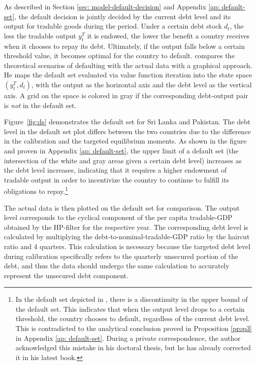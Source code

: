 As described in Section \ref{sec: model-default-decision} and Appendix \ref{ap: default-set}, the default decision is jointly decided by the current debt level and its output for tradable goods during the period. Under a certain debt stock $d_t$, the less the tradable output $y^T_t$ it is endowed, the lower the benefit a country receives when it chooses to repay its debt.
Ultimately, if the output falls below a certain threshold value, it becomes optimal for the country to default.
\citet{Hinrichsen_2020-chapter4} compares the theoretical scenarios of defaulting with the actual data with a graphical approach. He maps the default set evaluated via value function iteration into the state space $(y^T_t, d_t)$, with the output as the horizontal axis and the debt level as the vertical axis. A grid on the space is colored in gray if the corresponding debt-output pair is \emph{not} in the default set.

Figure~\ref{fig:ds} demonstrates the default set for Sri Lanka and Pakistan. The debt level in the default set plot differs between the two countries due to the difference in the calibration and the targeted equilibrium moments. As shown in the figure and proven in Appendix \ref{ap: default-set}, the upper limit of a default set (the intersection of the white and gray areas given a certain debt level) increases as the debt level increases, indicating that it requires a higher endowment of tradable output in order to incentivize the country to continue to fulfill its obligations to repay.\footnote{
    In the default set depicted in \citet{Hinrichsen_2020-chapter4}, there is a discontinuity in the upper bound of the default set. This indicates that when the output level drops to a certain threshold, the country chooses to default, regardless of the current debt level. This is contradicted to the analytical conclusion proved in Proposition \ref{prop3} in Appendix \ref{ap: default-set}. During a private correspondence, the author acknowledged this mistake in his doctoral thesis, but he has already corrected it in his latest book.
}

The actual data is then plotted on the default set for comparison. The output level corresponds to the cyclical component of the per capita tradable-GDP obtained by the HP-filter for the respective year.
The corresponding debt level is calculated by multiplying the debt-to-nominal-tradable-GDP ratio by the haircut ratio and 4 quarters. This calculation is necessary because the targeted debt level during calibration specifically refers to the quarterly unsecured portion of the debt, and thus the data should undergo the same calculation to accurately represent the unsecured debt component.

